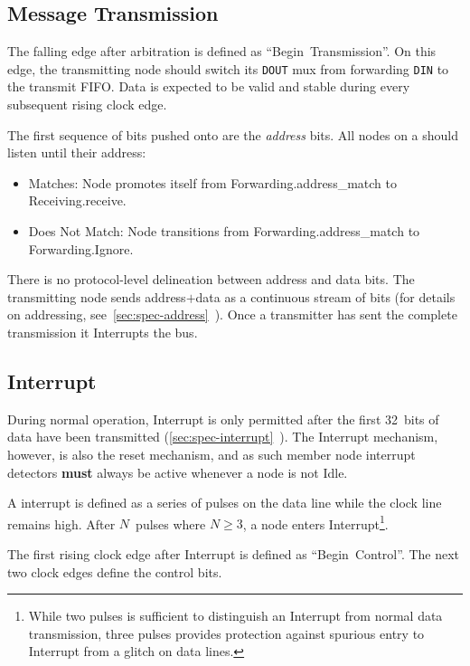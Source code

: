 \subsection{Message Transmission}
\label{sec:protocol-transmission}
The falling edge after arbitration is defined as ``Begin~Transmission''. On this
edge, the transmitting node should switch its {\tt DOUT} mux from forwarding
{\tt DIN} to the transmit FIFO. Data is expected to be valid and stable during
every subsequent rising clock edge.

The first sequence of bits pushed onto \bus are the {\em address} bits. All
nodes on a \bus should listen until their address:
\begin{itemize}
  \item Matches: Node promotes itself from Forwarding.{\sc address\_match} to
    Receiving.{\sc receive}.
  \item Does Not Match: Node transitions from Forwarding.{\sc address\_match}
    to Forwarding.{\sc Ignore}.
\end{itemize}

There is no protocol-level delineation between address and data bits. The
transmitting node sends address$+$data as a continuous stream of bits (for
details on \bus addressing,
see~\ref{sec:spec-address}~). Once a transmitter has
sent the complete transmission it Interrupts the bus.

\subsection{Interrupt}
\label{sec:protocol-interrupt}
During normal operation, Interrupt is only permitted after the first 32~bits
of data have been transmitted
(\ref{sec:spec-interrupt}~). The Interrupt
mechanism, however, is also the \bus reset mechanism, and as such member node
interrupt detectors {\bf must} always be active whenever a node is not Idle.

A \bus interrupt is defined as a series of pulses on the data line while the
clock line remains high. After $N$~pulses where $N \ge 3$, a node enters
Interrupt\footnote{
  While two pulses is sufficient to distinguish an Interrupt from normal data
  transmission, three pulses provides protection against spurious entry to
  Interrupt from a glitch on data lines.}.

The first rising clock edge after Interrupt is defined as ``Begin~Control''.
The next two clock edges define the control bits.

